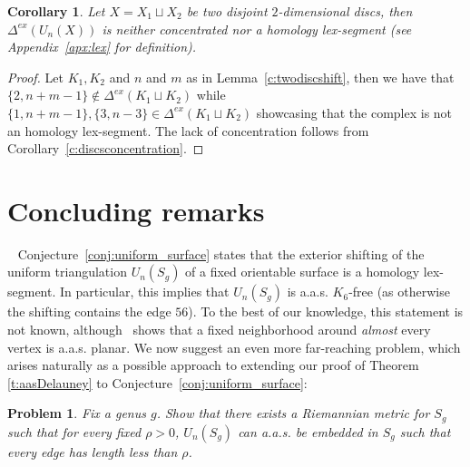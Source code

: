 \documentclass[reqno,english]{amsart}
\newtheorem{problem}[theorem]{Problem}
\newtheorem{corollary}[theorem]{Corollary}
\numberwithin{claimcounter}{theorem}
\theoremstyle{remark}
\theoremstyle{definition}
\numberwithin{theorem}{section}
\newcommand{\exshift}[1]{\Delta^{ex}(#1)}
\begin{document}
\begin{corollary}
    Let $X=X_1\sqcup X_2$ be two disjoint $2$-dimensional discs, then $\exshift{U_n(X)}$ is neither concentrated nor a homology lex-segment (see Appendix~\ref{apx:lex} for definition).
\end{corollary}
\begin{proof}
    Let $K_1,K_2$ and $n$ and $m$ as in Lemma~\ref{c:twodiscshift}, then we have that $\{2,n+m-1\}\notin \exshift{K_1\sqcup K_2}$ while $\{1,n+m-1\},\{3,n-3\}\in \exshift{K_1\sqcup K_2}$ showcasing that the complex is not an homology lex-segment. The lack of concentration follows from  Corollary~\ref{c:discsconcentration}.
\end{proof}

\noindent


\section{Concluding remarks}~\label{sec:Conclude}
Conjecture~\ref{conj:uniform_surface} states that the exterior shifting of the uniform triangulation $U_n(S_g)$ of a fixed orientable surface is a homology lex-segment. In particular, this implies that  $U_n(S_g)$ is a.a.s. $K_6$-free (as otherwise the shifting contains the edge $56$). 
To the best of our knowledge, this statement is not known, although~\cite{budzinski2022multi} shows that a fixed neighborhood around \textit{almost} every vertex is a.a.s. planar. We now suggest an even more far-reaching problem, which arises naturally as a possible approach to extending our proof of Theorem \ref{t:aasDelauney} to Conjecture~\ref{conj:uniform_surface}:

\begin{problem}
    Fix a genus $g$. Show that there exists a Riemannian metric for $S_g$ such that for every fixed $\rho>0$, $U_n(S_g)$ can a.a.s. be embedded in $S_g$  such that every edge has length less than $\rho$. 
\end{problem}
 
\end{document}
